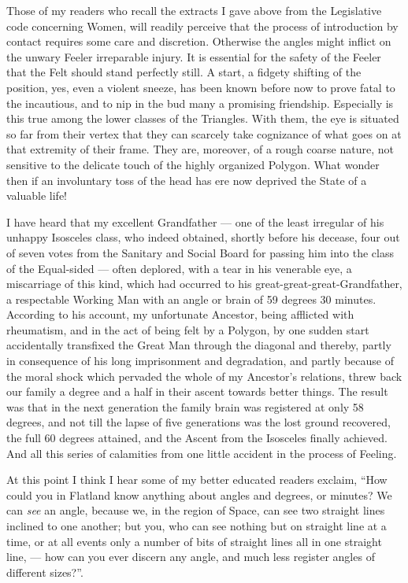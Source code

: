 \documentclass[10pt, kindle, oneside]{kindle}
\begin{document}
Those of my readers who recall the extracts I gave above from the Legislative
code concerning Women, will readily perceive that the process of introduction
by contact requires some care and discretion. Otherwise the angles might
inflict on the unwary Feeler irreparable injury. It is essential for the
safety of the Feeler that the Felt should stand perfectly still. A start, a
fidgety shifting of the position, yes, even a violent sneeze, has been known
before now to prove fatal to the incautious, and to nip in the bud many a
promising friendship. Especially is this true among the lower classes of the
Triangles. With them, the eye is situated so far from their vertex that they
can scarcely take cognizance of what goes on at that extremity of their frame.
They are, moreover, of a rough coarse nature, not sensitive to the delicate
touch of the highly organized Polygon. What wonder then if an involuntary toss
of the head has ere now deprived the State of a valuable life!

I have heard that my excellent Grandfather --- one of the least irregular of his
unhappy Isosceles class, who indeed obtained, shortly before his decease, four
out of seven votes from the Sanitary and Social Board for passing him into the
class of the Equal-sided --- often deplored, with a tear in his venerable eye, a
miscarriage of this kind, which had occurred to his
great-great-great-Grandfather, a respectable Working Man with an angle or
brain of 59 degrees 30 minutes. According to his account, my unfortunate
Ancestor, being afflicted with rheumatism, and in the act of being felt by a
Polygon, by one sudden start accidentally transfixed the Great Man through the
diagonal and thereby, partly in consequence of his long imprisonment and
degradation, and partly because of the moral shock which pervaded the whole of
my Ancestor's relations, threw back our family a degree and a half in their
ascent towards better things. The result was that in the next generation the
family brain was registered at only 58 degrees, and not till the lapse of five
generations was the lost ground recovered, the full 60 degrees attained, and
the Ascent from the Isosceles finally achieved. And all this series of
calamities from one little accident in the process of Feeling.

At this point I think I hear some of my better educated readers exclaim, ``How
could you in Flatland know anything about angles and degrees, or minutes? We can
\emph{see} an angle, because we, in the region of Space, can see two straight lines
inclined to one another; but you, who can see nothing but on straight line at
a time, or at all events only a number of bits of straight lines all in one
straight line, --- how can you ever discern any angle, and much less register
angles of different sizes?''.
\end{document}
